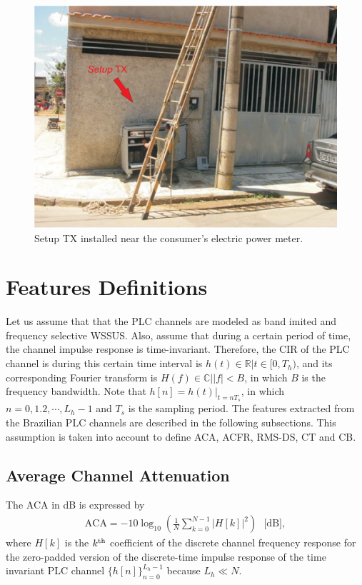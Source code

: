 \documentclass[journal]{IEEEtran}
\begin{document}
\begin{figure}[!htp]
	\begin{centering}		
	\includegraphics[scale=.4]{Figuras/setupTXnoconsumidor.eps}
	\caption{Setup TX installed near the consumer's electric power meter.}
		\label{Fig:setupRX}
	\end{centering}
\end{figure}

\section{Features Definitions}
\label{sec:parameters}

Let us assume that that the PLC channels are modeled as band imited and frequency selective \ac{WSSUS}. Also, assume that during a certain period of time, the channel impulse response is time-invariant. Therefore, the \ac{CIR} of the \ac{PLC} channel is during this certain time interval is  $ h(t)\in \mathbb{R}|t\in[0,T_h)$,  and its corresponding Fourier transform is $H(f)\in \mathbb{C}||f|<B$, in which $B$ is the frequency bandwidth. Note that $h[n]=h(t)|_{t=nT_s}$, in which $n=0,1.2,\cdots,L_h-1 $ and $T_s$ is the sampling period. The features extracted from the Brazilian PLC channels are described in the following subsections. This assumption is taken into account to define \ac{ACA}, \ac{ACFR}, \ac{RMS-DS}, \ac{CT} and \ac{CB}.

\subsection{Average Channel Attenuation}
The ACA in dB is expressed by
\begin{eqnarray}
	\textrm{ACA}=-10\log_{10}\left(\frac{1}{N}\sum_{k=0}^{N-1}|H[k]|^2\right) \ \ \ \mbox{[dB]},
\end{eqnarray}
where $H[k]$ is the $k^{\rm th}$ coefficient of the discrete channel frequency response for the zero-padded version of the discrete-time impulse response of the time invariant PLC channel $\{h[n]\}_{n=0}^{L_h-1}$ because $L_h \ll N$.
\end{document}
